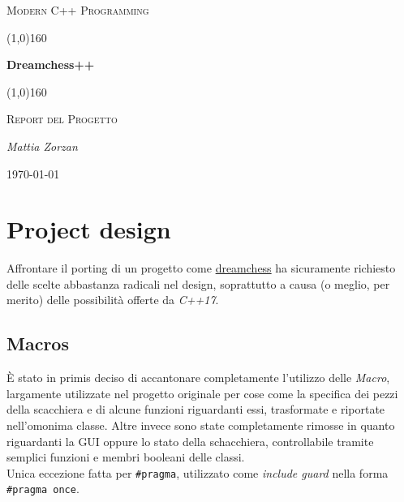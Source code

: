 \documentclass{article}
\begin{document}
    \clearpage

    \begin{titlepage}
        \centering
        \vspace*{\fill}
        {\scshape\LARGE Modern C++ Programming \par}
        \vspace{1.5cm}
        \line(1,0){160} \\
        {\huge\bfseries Dreamchess++ \par}
        \line(1,0){160} \\
        \vspace{0.5cm}
        {\scshape\LARGE Report del Progetto \par}
        \vspace{2cm}
        {\Large\itshape Mattia Zorzan \par}
        \vspace{1cm}

        \vspace{5cm}
        \vspace*{\fill}
        {\large \today \par}
    \end{titlepage}
    \thispagestyle{empty}
    \newpage
    \tableofcontents
    \thispagestyle{empty}
    \newpage
    \section{Project design}\label{sec:design}
        Affrontare il porting di un progetto come \href{https://github.com/dreamchess/dreamchess}{dreamchess} ha sicuramente richiesto delle scelte abbastanza radicali nel design, soprattutto a causa (o meglio, per merito) delle possibilità offerte da \textit{C++17}.
        \subsection{Macros}\label{subsec:macros}
            È stato in primis deciso di accantonare completamente l'utilizzo delle \textit{Macro}, largamente utilizzate nel progetto originale per cose come la specifica dei pezzi della scacchiera e di alcune funzioni riguardanti essi, trasformate e riportate nell'omonima classe.
            Altre invece sono state completamente rimosse in quanto riguardanti la GUI oppure lo stato della schacchiera, controllabile tramite semplici funzioni e membri booleani delle classi.\\
            Unica eccezione fatta per \texttt{\#pragma}, utilizzato come \textit{include guard} nella forma \texttt{\#pragma once}.
\end{document}
